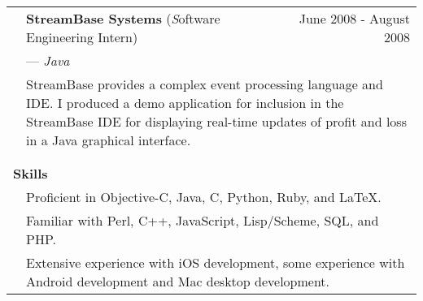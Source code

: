 \documentclass{article}
\begin{document}
\begin{tabular}{llr}
  \\

  & {\large\bf StreamBase Systems} ({\emph Software Engineering Intern}) & June 2008 - August 2008\\
  & \multicolumn{2}{l}{---  \emph{Java}} \\

  & \multicolumn{2}{p{6in}}{StreamBase provides a complex event processing
    language and IDE. I produced a demo application for inclusion in the
    StreamBase IDE for displaying real-time updates of profit and loss in a Java
    graphical interface.} \\

  \\ 

  \cline{2-3}\\


 
  \multicolumn{2}{l}{{\Large\bf Skills} \vspace{1mm} }& \\
  & \multicolumn{2}{p{6in}}{Proficient in Objective-C, Java, C, Python, Ruby, and \LaTeX{}.}\\
  & \multicolumn{2}{p{6in}}{Familiar with Perl, C++, JavaScript, Lisp/Scheme, SQL, and PHP.}\\
  & \multicolumn{2}{p{6in}}{Extensive experience with iOS development, some experience with Android development and Mac desktop development.}\\

  
\end{tabular}
\end{document}

